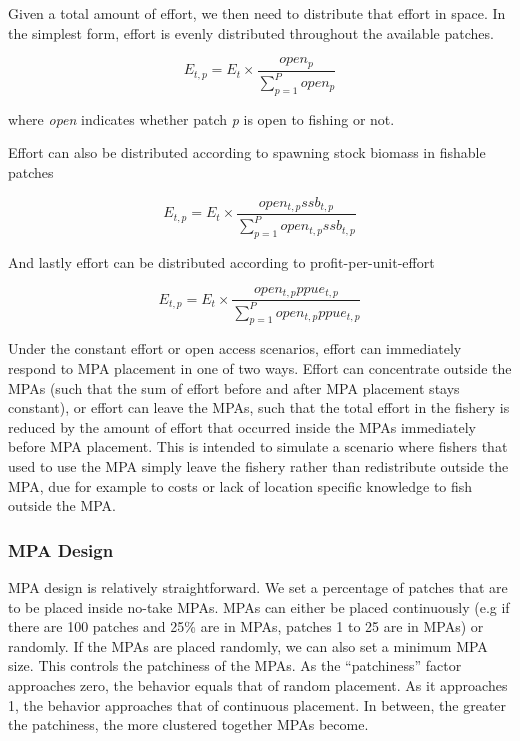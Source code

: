 \documentclass[]{article}
\begin{document}
Given a total amount of effort, we then need to distribute that effort in space. In the simplest form, effort is evenly distributed throughout the available patches.

\begin{equation}
E_{t,p} = E_t \times \frac{open_p}{\sum_{p=1}^Popen_p}
  \label{eq:simpleeffort}
\end{equation}

where \emph{open} indicates whether patch \emph{p} is open to fishing or not.

Effort can also be distributed according to spawning stock biomass in fishable patches

\begin{equation}
E_{t,p} = E_t \times \frac{open_{t,p}ssb_{t,p}}{\sum_{p=1}^Popen_{t,p}ssb_{t,p}}
  \label{eq:biomasseffort}
\end{equation}

And lastly effort can be distributed according to profit-per-unit-effort

\begin{equation}
E_{t,p} = E_t \times \frac{open_{t,p}ppue_{t,p}}{\sum_{p=1}^Popen_{t,p}ppue_{t,p}}
  \label{eq:ppueeffort}
\end{equation}

Under the constant effort or open access scenarios, effort can immediately respond to MPA placement in one of two ways. Effort can concentrate outside the MPAs (such that the sum of effort before and after MPA placement stays constant), or effort can leave the MPAs, such that the total effort in the fishery is reduced by the amount of effort that occurred inside the MPAs immediately before MPA placement. This is intended to simulate a scenario where fishers that used to use the MPA simply leave the fishery rather than redistribute outside the MPA, due for example to costs or lack of location specific knowledge to fish outside the MPA.

\hypertarget{mpa-design}{%
\subsubsection{MPA Design}\label{mpa-design}}

MPA design is relatively straightforward. We set a percentage of patches that are to be placed inside no-take MPAs. MPAs can either be placed continuously (e.g if there are 100 patches and 25\% are in MPAs, patches 1 to 25 are in MPAs) or randomly. If the MPAs are placed randomly, we can also set a minimum MPA size. This controls the patchiness of the MPAs. As the ``patchiness'' factor approaches zero, the behavior equals that of random placement. As it approaches 1, the behavior approaches that of continuous placement. In between, the greater the patchiness, the more clustered together MPAs become.
\end{document}
